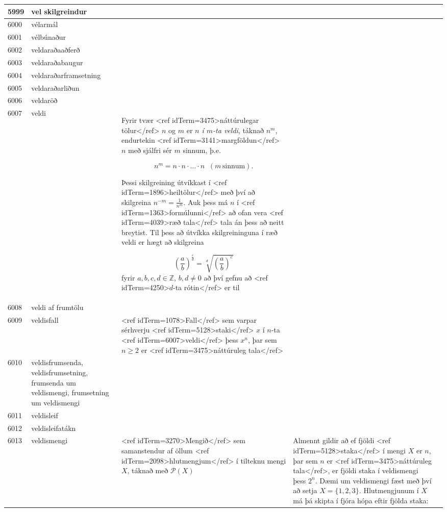 \begin{longtable}{p{}|p{}|p{}|p{}|p{}}
\hline
5999 & vel skilgreindur &  &  &  \\
\hline
6000 & vélarmál &  &  &  \\
\hline
6001 & vélbúnaður &  &  &  \\
\hline
6002 & veldaraðaaðferð &  &  &  \\
\hline
6003 & veldaraðabaugur &  &  &  \\
\hline
6004 & veldaraðarframsetning &  &  &  \\
\hline
6005 & veldaraðarliðun &  &  &  \\
\hline
6006 & veldaröð &  &  &  \\
\hline
6007 & veldi & Fyrir tvær <ref idTerm=3475>náttúrulegar tölur</ref> $n$ og $m$ er \textit{$n$ í $m$-ta veldi}, táknað $n^m$, endurtekin <ref idTerm=3141>margföldun</ref> $n$ með sjálfri sér $m$ sinnum, þ.e.

\[ n^m = n \cdot n \cdot \ldots \cdot n \;\; (m\, \text{sinnum}). \]  

Þessi skilgreining útvíkkast í <ref idTerm=1896>heiltölur</ref> með því að skilgreina $n^{-m}=\frac{1}{n^m}$. Auk þess má $n$ í <ref idTerm=1363>formúlunni</ref> að ofan vera <ref idTerm=4039>ræð tala</ref> tala án þess að neitt breytist. Til þess að útvíkka skilgreininguna í ræð veldi er hægt að skilgreina

\[ \left(\frac{a}{b}\right)^\frac{c}{d} = \sqrt[d]{\left(\frac{a}{b}\right)^c} \] fyrir $a,b,c,d \in \mathbb{Z}$, $b,d\neq0$ að því gefnu að <ref idTerm=4250>$d$-ta rótin</ref> er til &  & \\
\hline
6008 & veldi af frumtölu &  &  &  \\
\hline
6009 & veldisfall & <ref idTerm=1078>Fall</ref> sem varpar sérhverju <ref idTerm=5128>staki</ref> $x$ í $n$-ta <ref idTerm=6007>veldi</ref> þess $x^n$, þar sem $n \geq 2$ er <ref idTerm=3475>náttúruleg tala</ref> &  &  \\
\hline
6010 & veldisfrumsenda, veldisfrumsetning, frumsenda um veldismengi, frumsetning um veldismengi &  &  &  \\
\hline
6011 & veldisleif &  &  &  \\
\hline
6012 & veldisleifatákn &  &  &  \\
\hline
6013 & veldismengi & <ref idTerm=3270>Mengið</ref> sem samanstendur af öllum <ref idTerm=2098>hlutmengjum</ref> í tilteknu mengi $X$, táknað með $\mathcal{P}(X)$ & Almennt gildir að ef fjöldi <ref idTerm=5128>staka</ref> í mengi $X$ er $n$, þar sem $n$ er <ref idTerm=3475>náttúruleg tala</ref>, er fjöldi staka í veldismengi þess $2^n$. Dæmi um veldismengi fæst með því að setja $X = \{1,2,3\}$. Hlutmengjunum í $X$ má þá skipta í fjóra hópa eftir fjölda staka:


\end{longtable}
